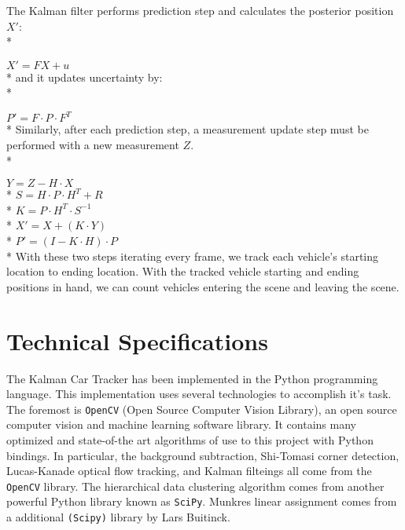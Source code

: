 \documentclass{article} %
\begin{document}
The Kalman filter performs prediction step and calculates the posterior position $X'$:\\*

{\centering
$X' = FX+u$\linebreak\newline\\*}
and it updates uncertainty by:\\*

{\centering
$P' = F \cdot P \cdot F^T$\linebreak\newline\\*}
Similarly, after each prediction step, a measurement update step must be performed with a new measurement $Z$.\\*

{\centering
$Y = Z - H \cdot X$\\*
 $S = H \cdot P \cdot H^T + R$\\*
 $K = P \cdot H^T \cdot S^{-1}$\\*
 $X' = X + (K\cdot Y)$\\*
 $P' = (I - K \cdot H) \cdot P $\linebreak\newline\\*}
 With these two steps iterating every frame, we track each vehicle's starting location to ending location. With the tracked vehicle starting and ending positions in hand, we can count vehicles entering the scene and leaving the scene.
 
\section{Technical Specifications}
\label{sec:technical_specs}

The Kalman Car Tracker has been implemented in the Python programming language. This implementation uses several technologies to accomplish it's task. The foremost is \texttt{OpenCV} (Open Source Computer Vision Library), an open source computer vision and machine learning software library. \cite{wiki:opencv} It contains many optimized and state-of-the art algorithms of use to this project with Python bindings. In particular, the background subtraction, Shi-Tomasi corner detection, Lucas-Kanade optical flow tracking, and Kalman filteings all come from the \texttt{OpenCV} library. The hierarchical data clustering algorithm comes from another powerful Python library known as \texttt{SciPy}. Munkres linear assignment comes from a additional \texttt{(Scipy)} library by Lars Buitinck.\cite{scipy}
\end{document}
